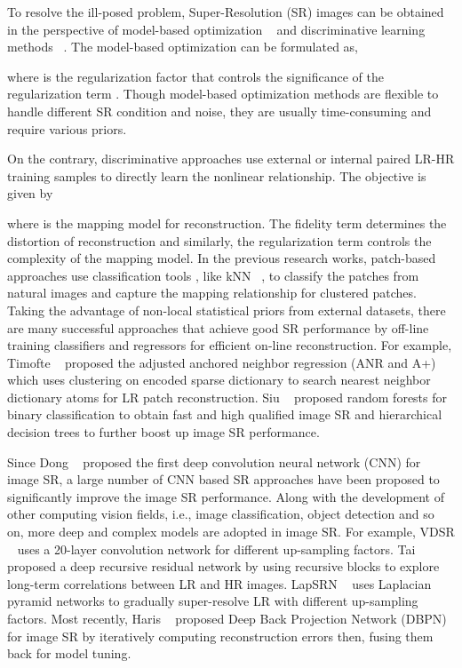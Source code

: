 \documentclass[10pt,twocolumn,letterpaper]{article}
\begin{document}
To resolve the ill-posed problem, Super-Resolution (SR) images can be obtained in the perspective of model-based optimization ~\cite{GMM,K-SVD,NCSR,BM3D,WNNM} and discriminative learning methods ~\cite{SRCNN,VDSR,DRRN,LapSRN,EDSR,DBPN}. The model-based optimization can be formulated as,
\begin{small}

\end{small}{}
where  is the regularization factor that controls the significance of the regularization term . Though model-based optimization methods are flexible to handle different SR condition and noise, they are usually time-consuming and require various priors. 

On the contrary, discriminative approaches use external or internal paired LR-HR training samples to directly learn the nonlinear relationship. The objective is given by
\begin{small}

\end{small}
where  is the mapping model for reconstruction. The fidelity term  determines the distortion of reconstruction and similarly, the regularization term  controls the complexity of the mapping model. In the previous research works, patch-based approaches use classification tools , like kNN ~\cite{Chang2004}, to classify the patches from natural images and capture the mapping relationship for clustered patches. Taking the advantage of non-local statistical priors from external datasets, there are many successful approaches that achieve good SR performance by off-line training classifiers and regressors for efficient on-line reconstruction. For example, Timofte \etal ~\cite{Timofte2013,Timofte2015} proposed the adjusted anchored neighbor regression (ANR and A+) which uses clustering on encoded sparse dictionary to search nearest neighbor dictionary atoms for LR patch reconstruction. Siu \etal ~\cite{Junjie15,Junjie17,ISCAS17,ICIP18} proposed random forests for binary classification to obtain fast and high qualified image SR and hierarchical decision trees to further boost up image SR performance. 

Since Dong \etal ~\cite{SRCNN} proposed the first deep convolution neural network (CNN) for image SR, a large number of CNN based SR approaches have been proposed to significantly improve the image SR performance. Along with the development of other computing vision fields, i.e., image classification, object detection and so on, more deep and complex models are adopted in image SR. For example, VDSR ~\cite{VDSR} uses a 20-layer convolution network for different up-sampling factors. Tai \etal ~\cite{DRRN} proposed a deep recursive residual network by using recursive blocks to explore long-term correlations between LR and HR images. LapSRN ~\cite{LapSRN} uses Laplacian pyramid networks to gradually super-resolve LR with different up-sampling factors. Most recently, Haris \etal ~\cite{DBPN} proposed Deep Back Projection Network (DBPN) for image SR by iteratively computing reconstruction errors then, fusing them back for model tuning. 
\end{document}
